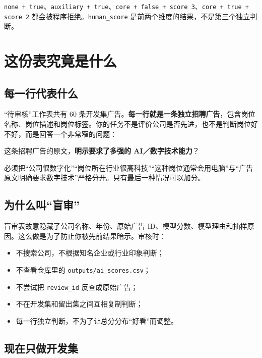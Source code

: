 \documentclass[11pt,a4paper,fontset=none]{ctexart}
\newcommand{\field}[1]{\nolinkurl{#1}}
\begin{document}
\begin{warningbox}
\texttt{none + true}、\texttt{auxiliary + true}、\texttt{core + false + score 3}、\texttt{core + true + score 2} 都会被程序拒绝。\field{human_score} 是前两个维度的结果，不是第三个独立判断。
\end{warningbox}

\section{这份表究竟是什么}

\subsection{每一行代表什么}

“待审核”工作表共有 60 条开发集广告。\textbf{每一行就是一条独立招聘广告}，包含岗位名称、岗位描述和岗位标签。你的任务不是评价公司是否先进，也不是判断岗位好不好，而是回答一个非常窄的问题：

\begin{keybox}[本研究唯一构念]
这条招聘广告的原文，\textbf{明示要求了多强的 AI／数字技术能力}？
\end{keybox}

必须把“公司很数字化”“岗位所在行业很高科技”“这种岗位通常会用电脑”与“广告原文明确要求数字技术”严格分开。只有最后一种情况可以加分。

\subsection{为什么叫“盲审”}

盲审表故意隐藏了公司名称、年份、原始广告 ID、模型分数、模型理由和抽样原因。这么做是为了防止你被先前结果暗示。审核时：

\begin{itemize}
  \item 不搜索公司，不根据知名企业或行业印象判断；
  \item 不查看仓库里的 \texttt{outputs/ai\_scores.csv}；
  \item 不尝试把 \field{review_id} 反查成原始广告；
  \item 不在开发集和留出集之间互相复制判断；
  \item 每一行独立判断，不为了让总分分布“好看”而调整。
\end{itemize}

\subsection{现在只做开发集}
\end{document}
